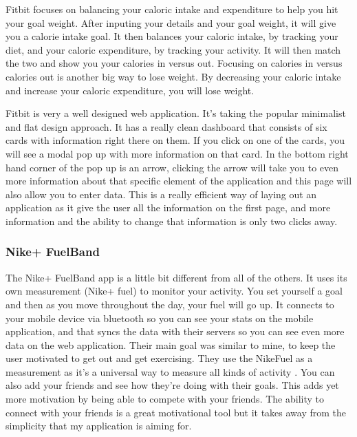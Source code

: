 Fitbit focuses on balancing your caloric intake and expenditure to help you hit your goal weight. After inputing your details and your goal weight, it will give you a calorie intake goal. It then balances your caloric intake, by tracking your diet, and your caloric expenditure, by tracking your activity. It will then match the two and show you your calories in versus out. Focusing on calories in versus calories out is another big way to lose weight. By decreasing your caloric intake and increase your caloric expenditure, you will lose weight.

Fitbit is very a well designed web application. It’s taking the popular minimalist and flat design approach. It has a really clean dashboard that consists of six cards with information right there on them. If you click on one of the cards, you will see a modal pop up with more information on that card. In the bottom right hand corner of the pop up is an arrow, clicking the arrow will take you to even more information about that specific element of the application and this page will also allow you to enter data. This is a really efficient way of laying out an application as it give the user all the information on the first page, and more information and the ability to change that information is only two clicks away.

\subsubsection{Nike+ FuelBand}
The Nike+ FuelBand app is a little bit different from all of the others. It uses its own measurement (Nike+ fuel) to monitor your activity. You set yourself a goal and then as you move throughout the day, your fuel will go up. It connects to your mobile device via bluetooth so you can see your stats on the mobile application, and that syncs the data with their servers so you can see even more data on the web application. Their main goal was similar to mine, to keep the user motivated to get out and get exercising. They use the NikeFuel as a measurement as it’s a universal way to measure all kinds of activity \citep{fuelbandpress}. You can also add your friends and see how they’re doing with their goals. This adds yet more motivation by being able to compete with your friends. The ability to connect with your friends is a great motivational tool but it takes away from the simplicity that my application is aiming for.

